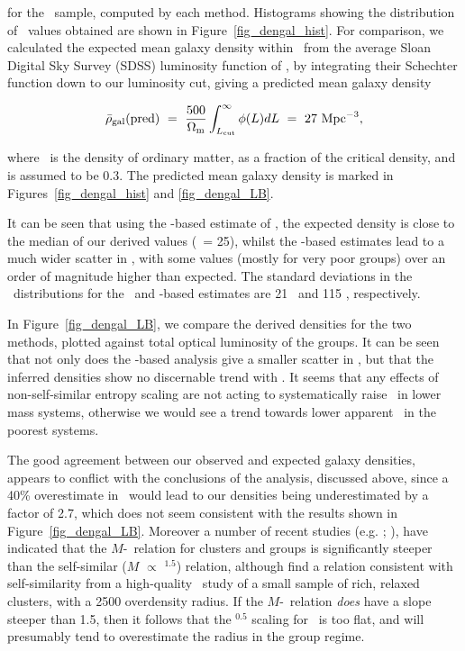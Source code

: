 \documentclass[usenatbib]{mn2e}
\begin{document}
\noindent for the \GEMS\ sample, computed by each method.  Histograms showing the
distribution of \dengal\ values obtained are shown in
Figure~\ref{fig_dengal_hist}.  For comparison, we calculated the expected mean
galaxy density within \rfh\ from the average Sloan Digital Sky Survey (SDSS)
luminosity function of \citet{blanton03}, by integrating their Schechter function
down to our luminosity cut, giving a predicted mean galaxy density

\begin{equation}
\bar{\rho}_{\mathrm{gal}}(\mathrm{pred}) ~ = ~ \frac{500}{\Omega_{\mathrm{m}}} \int^{\infty}_{L_{\mathrm{cut}}} \phi(L) dL ~ = ~ 27 ~ \mbox{Mpc}^{-3},
\label{eqn_dengalpred}
\end{equation} 

\noindent where \omegam\ is the density of ordinary matter, as a fraction of the
critical density, and is assumed to be 0.3.  The predicted mean galaxy density is
marked in Figures~\ref{fig_dengal_hist} and \ref{fig_dengal_LB}.   

It can be seen that using the \TX-based estimate of \rfh, the expected density is
close to the median of our derived values (\dengal\ = 25), whilst the
\sigmav-based estimates lead to a much wider scatter in \dengal, with some values
(mostly for very poor groups) over an order of magnitude higher than expected.
The standard deviations in the \dengal\ distributions for the \TX\ and
\sigmav-based estimates are 21 \pMpccu\ and 115 \pMpccu, respectively.

In Figure~\ref{fig_dengal_LB}, we compare the derived densities for the two
methods, plotted against total optical luminosity of the groups.  It can be seen
that not only does the \TX-based analysis give a smaller scatter in \dengal, but
that the inferred densities show no discernable  trend with \LB. It seems that
any effects of non-self-similar entropy scaling are not acting to systematically
raise \TX\ in lower mass systems, otherwise we would see a trend towards lower
apparent \dengal\ in the poorest systems.

The good agreement between our observed and expected galaxy densities, appears to
conflict with the conclusions of the \citet{sanderson03a} analysis, discussed
above, since a 40\% overestimate in \rfh\ would lead to our densities being
underestimated by a factor of 2.7, which does not seem consistent with the
results shown in Figure~\ref{fig_dengal_LB}.  Moreover a number of recent studies
(e.g. \citealt*{nevalainen00a}; \citealt{sato00,finoguenov01b}), have indicated
that the $M$-\TX\ relation for clusters and groups is significantly steeper than
the self-similar ($M$ $\propto$ \TX$^{1.5}$) relation, although \citet*{allen01d}
find a relation consistent with self-similarity from a high-quality \Chandra\
study of a small sample of rich, relaxed clusters, with a 2500 overdensity
radius.  If the $M$-\TX\ relation {\it does} have a slope steeper than 1.5, then
it follows that the \TX$^{0.5}$ scaling for \rfh\ is too flat, and will
presumably tend to overestimate the radius in the group regime.
\end{document}
